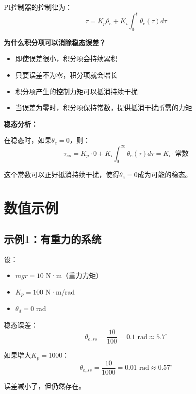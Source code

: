 \documentclass[12pt,a4paper]{article}
\begin{document}
PI控制器的控制律为：
\begin{equation}
\tau = K_p \theta_e + K_i \int_0^t \theta_e(\tau) d\tau
\end{equation}

\textbf{为什么积分项可以消除稳态误差？}

\begin{itemize}
\item 即使误差很小，积分项会持续累积
\item 只要误差不为零，积分项就会增长
\item 积分项产生的控制力矩可以抵消持续干扰
\item 当误差为零时，积分项保持常数，提供抵消干扰所需的力矩
\end{itemize}

\textbf{稳态分析：}

在稳态时，如果$\theta_e = 0$，则：
\begin{equation}
\tau_{ss} = K_p \cdot 0 + K_i \int_0^{\infty} \theta_e(\tau) d\tau = K_i \cdot \text{常数}
\end{equation}

这个常数可以正好抵消持续干扰，使得$\theta_e = 0$成为可能的稳态。

\section{数值示例}

\subsection{示例1：有重力的系统}

设：
\begin{itemize}
\item $mgr = 10$ N·m（重力力矩）
\item $K_p = 100$ N·m/rad
\item $\theta_d = 0$ rad
\end{itemize}

稳态误差：
\begin{equation}
\theta_{e,ss} = \frac{10}{100} = 0.1 \text{ rad} \approx 5.7^\circ
\end{equation}

如果增大$K_p = 1000$：
\begin{equation}
\theta_{e,ss} = \frac{10}{1000} = 0.01 \text{ rad} \approx 0.57^\circ
\end{equation}

误差减小了，但仍然存在。
\end{document}
